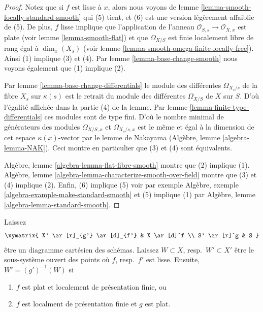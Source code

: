 \begin{proof}
Notez que si $f$ est lisse à $x$, alors nous voyons de lemme \ref{lemma-smooth-locally-standard-smooth} qui (5) tient, et (6) est une version légèrement affaiblie de (5). De plus, $f$ lisse implique que l'application de l'anneau $\mathcal{O}_{S, s} \to \mathcal{O}_{X, x}$ est plate (voir lemme \ref{lemma-smooth-flat}) et que $\Omega_{X/S}$ est finie localement libre de rang égal à $\dim_x(X_s)$ (voir lemme \ref{lemma-smooth-omega-finite-locally-free}). Ainsi (1) implique (3) et (4). Par lemme \ref{lemma-base-change-smooth} nous voyons également que (1) implique (2).

\medskip\noindent
Par lemme \ref{lemma-base-change-differentials} le module des différentes $\Omega_{X_s/s}$ de la fibre $X_s$ sur $\kappa(s)$ est le retrait du module des différentes $\Omega_{X/S}$ de $X$ sur $S$. D'où l'égalité affichée dans la partie (4) de la lemme. Par lemme \ref{lemma-finite-type-differentials} ces modules sont de type fini. D'où le nombre minimal de générateurs des modules $\Omega_{X/S, x}$ et $\Omega_{X_s/s, x}$ est le même et égal à la dimension de cet espace $\kappa(x)$-vector par le lemme de Nakayama (Algèbre, lemme \ref{algebra-lemma-NAK}). Ceci montre en particulier que (3) et (4) sont équivalents.

\medskip\noindent
Algèbre, lemme \ref{algebra-lemma-flat-fibre-smooth} montre que (2) implique (1). Algèbre, lemme \ref{algebra-lemma-characterize-smooth-over-field} montre que (3) et (4) implique (2). Enfin, (6) implique (5) voir par exemple Algèbre, exemple \ref{algebra-example-make-standard-smooth} et (5) implique (1) par Algèbre, lemme \ref{algebra-lemma-standard-smooth}.
\end{proof}

\begin{lemma}

\label{lemma-set-points-where-fibres-smooth}
Laissez $$
\xymatrix{
X' \ar[r]_{g'} \ar[d]_{f'} & X \ar[d]^f \\
S' \ar[r]^g & S
}
$$ être un diagramme cartésien des schémas. Laissez $W \subset X$, resp.\ $W' \subset X'$ être le sous-système ouvert des points où $f$, resp.\ $f'$ est lisse. Ensuite, $W' = (g')^{-1}(W)$ si
\begin{enumerate}
\item $f$ est plat et localement de présentation finie, ou
\item $f$ est localment de présentation finie et $g$ est plat.
\end{enumerate}

\end{lemma}

